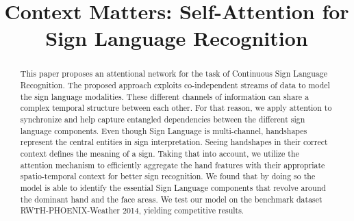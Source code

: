 \documentclass[a4paper,conference]{IEEEtran}
\begin{document}
\title{Context Matters: Self-Attention for\\Sign Language Recognition}


\author{
\and
{}
}









\maketitle

\begin{abstract}

This paper proposes an attentional network for the task of Continuous Sign Language Recognition. The proposed approach exploits co-independent streams of data to model the sign language modalities. These different channels of information can share a complex temporal structure between each other. For that reason, we apply attention to synchronize and help capture entangled dependencies between the different sign language components. Even though Sign Language is multi-channel, handshapes represent the central entities in sign interpretation. Seeing handshapes in their correct context defines the meaning of a sign. Taking that into account, we utilize the attention mechanism to efficiently aggregate the hand features with their appropriate spatio-temporal context for better sign recognition. We found that by doing so the model is able to identify the essential Sign Language components that revolve around the dominant hand and the face areas. We test our model on the benchmark dataset RWTH-PHOENIX-Weather 2014, yielding competitive results. 



\end{abstract}




\IEEEpeerreviewmaketitle
\end{document}
